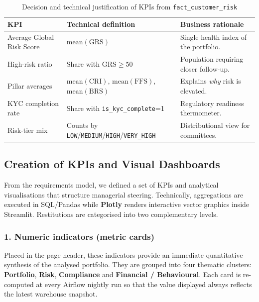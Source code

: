 \begin{table}[H]
\centering
\caption{Decision and technical justification of KPIs from \texttt{fact\_customer\_risk}}
\label{tab:kpi_fact_risk}
\renewcommand{\arraystretch}{1.2}
\scriptsize
\begin{tabular}{|p{3.5cm}|p{5.0cm}|p{6.0cm}|}
\hline
\rowcolor{blue!25}
\textbf{KPI} & \textbf{Technical definition} & \textbf{Business rationale} \\
\hline
Average Global Risk Score & $\mathrm{mean}(\mathrm{GRS})$ & Single health index of the portfolio. \\
\hline
High-risk ratio & Share with $\mathrm{GRS}\ge 50$ & Population requiring closer follow-up. \\
\hline
Pillar averages & $\mathrm{mean}(\mathrm{CRI})$, $\mathrm{mean}(\mathrm{FFS})$, $\mathrm{mean}(\mathrm{BRS})$ & Explains \emph{why} risk is elevated. \\
\hline
KYC completion rate & Share with \texttt{is\_kyc\_complete}=1 & Regulatory readiness thermometer. \\
\hline
Risk-tier mix & Counts by \texttt{LOW}/\texttt{MEDIUM}/\texttt{HIGH}/\texttt{VERY\_HIGH} & Distributional view for committees. \\
\hline
\end{tabular}
\end{table}

\subsection{Creation of KPIs and Visual Dashboards}
From the requirements model, we defined a set of KPIs and analytical
visualisations that structure managerial steering. Technically, aggregations are
executed in SQL/Pandas while \textbf{Plotly} renders interactive vector graphics
inside Streamlit. Restitutions are categorised into two complementary levels.

\subsubsection*{1. Numeric indicators (metric cards)}
Placed in the page header, these indicators provide an immediate quantitative
synthesis of the analysed portfolio. They are grouped into four thematic
clusters: \textbf{Portfolio}, \textbf{Risk}, \textbf{Compliance} and
\textbf{Financial / Behavioural}. Each card is re-computed at every Airflow
nightly run so that the value displayed always reflects the latest warehouse
snapshot.

